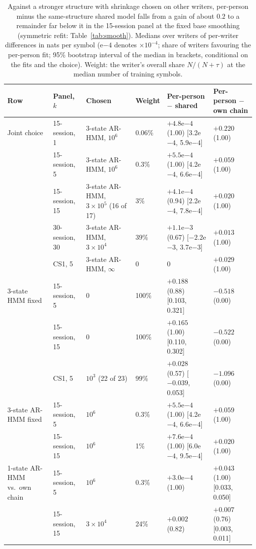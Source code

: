 \documentclass[pdflatex,sn-basic]{sn-jnl}
\newcommand{\hmmthree}{\mbox{3-state} HMM}
\newcommand{\arone}{\mbox{1-state} \mbox{AR-HMM}}
\newcommand{\arthree}{\mbox{3-state} \mbox{AR-HMM}}
\begin{document}
\begin{table}[t]
\centering
\caption{Against a stronger structure with shrinkage chosen on other writers, per-person minus the same-structure shared model falls from a gain of about $0.2$ to a remainder far below it in the 15-session panel at the fixed base smoothing (symmetric refit: Table~\ref{tab:smooth}). Medians over writers of per-writer differences in nats per symbol (e$-4$ denotes $\times10^{-4}$; share of writers favouring the per-person fit; 95\% bootstrap interval of the median in brackets, conditional on the fits and the choice). Weight: the writer's overall share $N/(N+\tau)$ at the median number of training symbols.}
\label{tab:main}
\setlength{\tabcolsep}{3pt}
\begin{tabular}{@{}>{\raggedright}p{1.75cm} >{\raggedright}p{1.95cm} >{\raggedright}p{2.25cm} l >{\raggedright}p{2.9cm} >{\raggedright\arraybackslash}p{2.0cm}@{}}
\toprule
Row & Panel, $k$ & Chosen & Weight & Per-person $-$ shared & Per-person $-$ own chain \\
\midrule
Joint choice & 15-session, 1 & \arthree, $10^6$ & 0.06\% & $+4.8$e$-4$ (1.00) [3.2e$-4$, 5.9e$-4$] & $+0.220$ (1.00) \\
 & 15-session, 5 & \arthree, $10^6$ & 0.3\% & $+5.5$e$-4$ (1.00) [4.2e$-4$, 6.6e$-4$] & $+0.059$ (1.00) \\
 & 15-session, 15 & \arthree, $3\times10^5$ (16 of 17) & 3\% & $+4.1$e$-4$ (0.94) [2.2e$-4$, 7.8e$-4$] & $+0.020$ (1.00) \\
 & 30-session, 30 & \arthree, $3\times10^4$ & 39\% & $+1.1$e$-3$ (0.67) [$-2.2$e$-3$, 3.7e$-3$] & $+0.013$ (1.00) \\
 & CS1, 5 & \arthree, $\infty$ & 0 & 0 & $+0.029$ (1.00) \\
\midrule
\hmmthree{} fixed & 15-session, 5 & 0 & 100\% & $+0.188$ (0.88) [0.103, 0.321] & $-0.518$ (0.00) \\
 & 15-session, 15 & 0 & 100\% & $+0.165$ (1.00) [0.110, 0.302] & $-0.522$ (0.00) \\
 & CS1, 5 & $10^3$ (22 of 23) & 99\% & $+0.028$ (0.57) [$-0.039$, 0.053] & $-1.096$ (0.00) \\
\midrule
\arthree{} fixed & 15-session, 5 & $10^6$ & 0.3\% & $+5.5$e$-4$ (1.00) [4.2e$-4$, 6.6e$-4$] & $+0.059$ (1.00) \\
 & 15-session, 15 & $10^6$ & 1\% & $+7.6$e$-4$ (1.00) [6.0e$-4$, 9.5e$-4$] & $+0.020$ (1.00) \\
\midrule
\arone{} vs.\ own chain & 15-session, 5 & $10^6$ & 0.3\% & $+3.0$e$-4$ (1.00) & $+0.043$ (1.00) [0.033, 0.050] \\
 & 15-session, 15 & $3\times10^4$ & 24\% & $+0.002$ (0.82) & $+0.007$ (0.76) [0.003, 0.011] \\
\bottomrule
\end{tabular}
\end{table}
\end{document}
